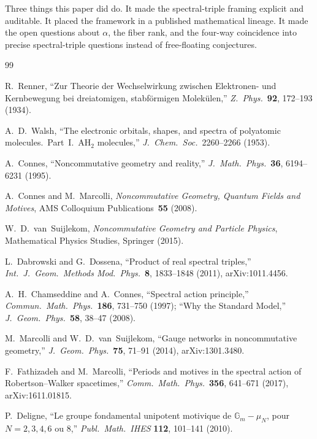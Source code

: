 \documentclass[11pt]{article}
\begin{document}
Three things this paper did do.  It made the spectral-triple framing
explicit and auditable.  It placed the framework in a published
mathematical lineage.  It made the open questions about $\alpha$, the
fiber rank, and the four-way coincidence into precise spectral-triple
questions instead of free-floating conjectures.

\begin{thebibliography}{99}

R.~Renner, ``Zur Theorie der Wechselwirkung zwischen Elektronen- und
Kernbewegung bei dreiatomigen, stabf\"ormigen Molek\"ulen,''
\textit{Z.~Phys.}\ \textbf{92}, 172--193 (1934).

A.~D.~Walsh, ``The electronic orbitals, shapes, and spectra of polyatomic
molecules.\ Part~I.\ AH$_2$ molecules,''
\textit{J.~Chem.\ Soc.}\ 2260--2266 (1953).

A.~Connes, ``Noncommutative geometry and reality,''
\textit{J.~Math.~Phys.}\ \textbf{36}, 6194--6231 (1995).

A.~Connes and M.~Marcolli, \textit{Noncommutative Geometry, Quantum
Fields and Motives}, AMS Colloquium Publications~\textbf{55} (2008).

W.~D.~van~Suijlekom, \textit{Noncommutative Geometry and Particle
Physics}, Mathematical Physics Studies, Springer (2015).

L.~Dabrowski and G.~Dossena, ``Product of real spectral triples,''
\textit{Int.~J.~Geom.~Methods Mod.~Phys.}\ \textbf{8}, 1833--1848
(2011), arXiv:1011.4456.

A.~H.~Chamseddine and A.~Connes,
``Spectral action principle,''
\textit{Commun.~Math.~Phys.}\ \textbf{186}, 731--750 (1997);
``Why the Standard Model,''
\textit{J.~Geom.~Phys.}\ \textbf{58}, 38--47 (2008).

M.~Marcolli and W.~D.~van~Suijlekom,
``Gauge networks in noncommutative geometry,''
\textit{J.~Geom.~Phys.}\ \textbf{75}, 71--91 (2014),
arXiv:1301.3480.

F.~Fathizadeh and M.~Marcolli,
``Periods and motives in the spectral action of Robertson--Walker
spacetimes,''
\textit{Comm.~Math.~Phys.}\ \textbf{356}, 641--671 (2017),
arXiv:1611.01815.

P.~Deligne,
``Le groupe fondamental unipotent motivique de
$\mathbb{G}_m - \mu_N$, pour $N = 2, 3, 4, 6$ ou $8$,''
\textit{Publ.~Math.~IHES} \textbf{112}, 101--141 (2010).


\end{thebibliography}
\end{document}

